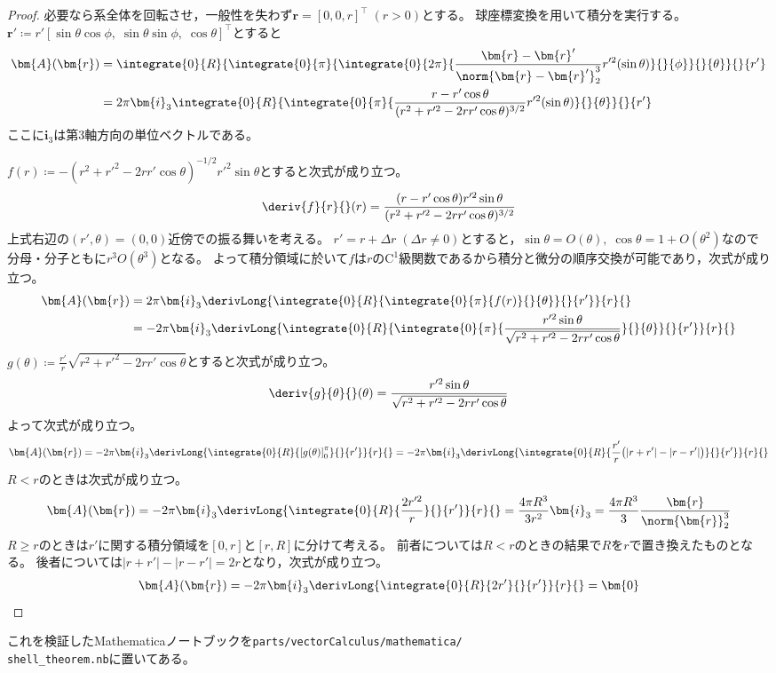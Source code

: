             \begin{proof}
                \quad\par
                必要なら系全体を回転させ，一般性を失わず$\bm{r} = [0,0,r]^\top\;(r>0)$とする。
                球座標変換を用いて積分を実行する。
                $\bm{r}' \coloneq r'[\sin\theta\cos\phi,\;\sin\theta\sin\phi,\;\cos\theta]^\top$とすると
                \begin{align*}
                    \bm{A}(\bm{r}) &= \integrate{0}{R}{\integrate{0}{\pi}{\integrate{0}{2\pi}{\frac{\bm{r}-\bm{r}'}{\norm{\bm{r}-\bm{r}'}_2^3}r'^2(\sin\theta)}{}{\phi}}{}{\theta}}{}{r'} \\
                    &= 2\pi\bm{i}_3\integrate{0}{R}{\integrate{0}{\pi}{\frac{r-r'\cos\theta}{(r^2+r'^2-2rr'\cos\theta)^{3/2}}r'^2(\sin\theta)}{}{\theta}}{}{r'}
                \end{align*}
                ここに$\bm{i}_3$は第3軸方向の単位ベクトルである。
                \par
                $f(r) \coloneq -(r^2+r'^2-2rr'\cos\theta)^{-1/2}r'^2\sin\theta$とすると次式が成り立つ。
                \[ \deriv{f}{r}{}(r) = \frac{(r-r'\cos\theta)r'^2\sin\theta}{(r^2+r'^2-2rr'\cos\theta)^{3/2}} \]
                上式右辺の$(r',\theta)=(0,0)$近傍での振る舞いを考える。
                $r'=r+\Delta r\;(\Delta r\neq 0)$とすると，$\sin\theta = O(\theta),\;\cos\theta = 1+O(\theta^2)$なので分母・分子ともに$r^3 O(\theta^3)$となる。
                よって積分領域に於いて$f$は$r$の$\mathrm{C}^1$級関数であるから積分と微分の順序交換が可能であり，次式が成り立つ。
                \begin{align*}
                    \bm{A}(\bm{r}) &= 2\pi\bm{i}_3\derivLong{\integrate{0}{R}{\integrate{0}{\pi}{f(r)}{}{\theta}}{}{r'}}{r}{} \\
                    &= -2\pi\bm{i}_3\derivLong{\integrate{0}{R}{\integrate{0}{\pi}{\frac{r'^2\sin\theta}{\sqrt{r^2+r'^2-2rr'\cos\theta}}}{}{\theta}}{}{r'}}{r}{}
                \end{align*}
                $g(\theta) \coloneq \frac{r'}{r}\sqrt{r^2+r'^2-2rr'\cos\theta}$とすると次式が成り立つ。
                \[ \deriv{g}{\theta}{}(\theta) = \frac{r'^2\sin\theta}{\sqrt{r^2+r'^2-2rr'\cos\theta}} \]
                よって次式が成り立つ。
                \[ \bm{A}(\bm{r}) = -2\pi\bm{i}_3\derivLong{\integrate{0}{R}{\left[g(\theta)\right]_0^\pi}{}{r'}}{r}{} = -2\pi\bm{i}_3\derivLong{\integrate{0}{R}{\frac{r'}{r}\bigl(|r+r'|-|r-r'|\bigr)}{}{r'}}{r}{} \]
                $R<r$のときは次式が成り立つ。
                \[ \bm{A}(\bm{r}) = -2\pi\bm{i}_3\derivLong{\integrate{0}{R}{\frac{2r'^2}{r}}{}{r'}}{r}{} = \frac{4\pi R^3}{3r^2}\bm{i}_3 = \frac{4\pi R^3}{3}\frac{\bm{r}}{\norm{\bm{r}}_2^3} \]
                $R\geq r$のときは$r'$に関する積分領域を$[0,r]$と$[r,R]$に分けて考える。
                前者については$R<r$のときの結果で$R$を$r$で置き換えたものとなる。
                後者については$|r+r'|-|r-r'| = 2r$となり，次式が成り立つ。
                \[ \bm{A}(\bm{r}) = -2\pi\bm{i}_3\derivLong{\integrate{0}{R}{2r'}{}{r'}}{r}{} = \bm{0} \]
            \end{proof}
            これを検証したMathematicaノートブックを\texttt{parts/vectorCalculus/mathematica/\\ shell\_theorem.nb}に置いてある。
